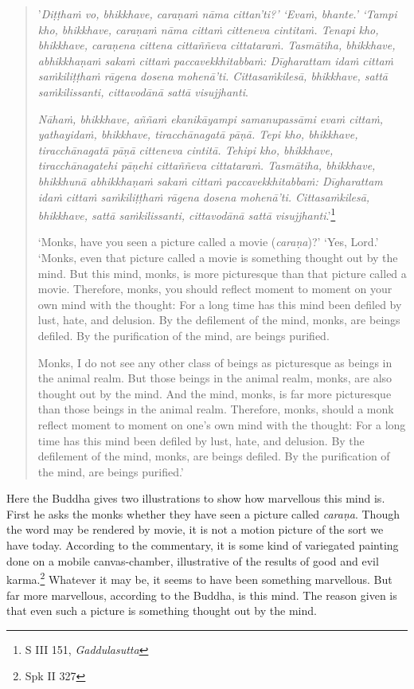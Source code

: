 \begin{quote}
'\emph{Diṭṭhaṁ vo, bhikkhave, caraṇaṁ nāma cittan'ti?' `Evaṁ, bhante.' `Tampi kho, bhikkhave, caraṇaṁ nāma cittaṁ citteneva cintitaṁ. Tenapi kho, bhikkhave, caraṇena cittena cittaññeva cittataraṁ. Tasmātiha, bhikkhave, abhikkhaṇaṁ sakaṁ cittaṁ paccavekkhitabbaṁ: Dīgharattam idaṁ cittaṁ saṁkiliṭṭhaṁ rāgena dosena mohenā'ti. Cittasaṁkilesā, bhikkhave, sattā saṁkilissanti, cittavodānā sattā visujjhanti}.

\emph{Nāhaṁ, bhikkhave, aññaṁ ekanikāyampi samanupassāmi evaṁ cittaṁ, yathayidaṁ, bhikkhave, tiracchānagatā pāṇā. Tepi kho, bhikkhave, tiracchānagatā pāṇā citteneva cintitā. Tehipi kho, bhikkhave, tiracchānagatehi pāṇehi cittaññeva cittataraṁ. Tasmātiha, bhikkhave, bhikkhunā abhikkhaṇaṁ sakaṁ cittaṁ paccavekkhitabbaṁ: Dīgharattam idaṁ cittaṁ saṁkiliṭṭhaṁ rāgena dosena mohenā'ti. Cittasaṁkilesā, bhikkhave, sattā saṁkilissanti, cittavodānā sattā visujjhanti}.'\footnote{S III 151, \emph{Gaddulasutta}}

`Monks, have you seen a picture called a movie (\emph{caraṇa})?' `Yes, Lord.' `Monks, even that picture called a movie is something thought out by the mind. But this mind, monks, is more picturesque than that picture called a movie. Therefore, monks, you should reflect moment to moment on your own mind with the thought: For a long time has this mind been defiled by lust, hate, and delusion. By the defilement of the mind, monks, are beings defiled. By the purification of the mind, are beings purified.

Monks, I do not see any other class of beings as picturesque as beings in the animal realm. But those beings in the animal realm, monks, are also thought out by the mind. And the mind, monks, is far more picturesque than those beings in the animal realm. Therefore, monks, should a monk reflect moment to moment on one's own mind with the thought: For a long time has this mind been defiled by lust, hate, and delusion. By the defilement of the mind, monks, are beings defiled. By the purification of the mind, are beings purified.'
\end{quote}

Here the Buddha gives two illustrations to show how marvellous this mind is. First he asks the monks whether they have seen a picture called \emph{caraṇa}. Though the word may be rendered by movie, it is not a motion picture of the sort we have today. According to the commentary, it is some kind of variegated painting done on a mobile canvas-chamber, illustrative of the results of good and evil karma.\footnote{Spk II 327} Whatever it may be, it seems to have been something marvellous. But far more marvellous, according to the Buddha, is this mind. The reason given is that even such a picture is something thought out by the mind.

